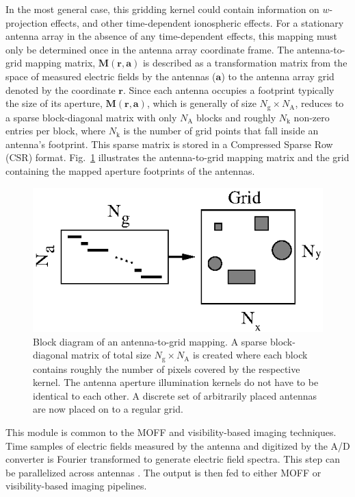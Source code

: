 \documentclass[a4paper,fleqn,usenatbib]{mnras}
\newcommand{\Nant}{N_\textrm{A}}
\newcommand{\Ngrid}{N_\textrm{g}}
\begin{document}
In the most general case, this gridding kernel could contain information on
$w$-projection effects, and other time-dependent ionospheric effects. For a
stationary antenna array in the absence of any time-dependent effects, this
mapping must only be determined once in the antenna array coordinate frame. The
antenna-to-grid mapping matrix, $\mathbf{M}(\mathbf{r},\mathbf{a})$ is described
as a transformation matrix from the space of measured electric fields by the 
antennas ($\mathbf{a}$) to the antenna array grid denoted by the coordinate 
$\mathbf{r}$. Since each antenna occupies a footprint typically the size of its 
aperture, $\mathbf{M}(\mathbf{r},\mathbf{a})$, which is generally of size
$\Ngrid\times \Nant$, reduces to a sparse block-diagonal matrix
with only $\Nant$ blocks and roughly $N_\textrm{k}$ non-zero entries per
block, where $N_\textrm{k}$ is the number of grid points that fall inside an
antenna's footprint. This sparse matrix is stored in a Compressed Sparse Row 
(CSR) format. Fig.~\ref{fig:a2g-mapping} illustrates the antenna-to-grid mapping
matrix and the grid containing the mapped aperture footprints of the antennas.

\begin{figure}
  \includegraphics[width=\columnwidth]{figure3}
  \caption{Block diagram of an antenna-to-grid mapping. A sparse block-diagonal
    matrix of total size $\Ngrid\times \Nant$ is created where each
    block contains roughly the number of pixels covered by the respective kernel.
    The antenna aperture illumination kernels do not have to be identical to each
    other. A discrete set of arbitrarily placed antennas are now placed on to a
    regular grid.}
  \label{fig:a2g-mapping}
\end{figure}

\par\medskip
{}
\par\medskip
\noindent This module is common to the MOFF and visibility-based imaging 
techniques. Time samples of electric fields measured by the antenna and 
digitized by the A/D converter is Fourier transformed to generate electric 
field spectra. This step can be parallelized across antennas%
. The output is then fed to either MOFF or 
visibility-based imaging pipelines.
\end{document}
